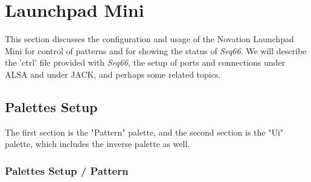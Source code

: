 %
%
%

\section{Launchpad Mini}
\label{sec:launchpad_mini}

   This section discusses the configuration and usage of the
   Novation Launchpad Mini for control of patterns and for showing the status
   of \textsl{Seq66}.
   We will describe the 'ctrl' file provided with \textsl{Seq66},
   the setup of ports and connections 
   under ALSA and under JACK, and perhaps some related topics.

\subsection{Palettes Setup}
\label{subsec:launchpad_mini_setup}

   The first section is the "Pattern" palette, and the second section is the
   "Ui" palette, which includes the inverse palette as well.

\subsubsection{Palettes Setup / Pattern}
\label{subsubsec:launchpad_mini_setup_pattern}

